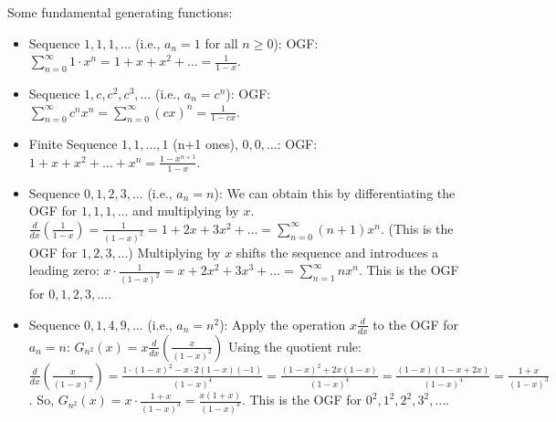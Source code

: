 \documentclass{report}
\begin{document}
Some fundamental generating functions:
\begin{itemize}
	\item Sequence $1, 1, 1, \dots$ (i.e., $a_n = 1$ for all $n \ge 0$):
	      OGF: $\sum_{n=0}^\infty 1 \cdot x^n = 1 + x + x^2 + \dots = \frac{1}{1-x}$.
	\item Sequence $1, c, c^2, c^3, \dots$ (i.e., $a_n = c^n$):
	      OGF: $\sum_{n=0}^\infty c^n x^n = \sum_{n=0}^\infty (cx)^n = \frac{1}{1-cx}$.
	\item Finite Sequence $1, 1, \dots, 1$ (n+1 ones), $0, 0, \dots$:
	      OGF: $1 + x + x^2 + \dots + x^n = \frac{1-x^{n+1}}{1-x}$.
	\item Sequence $0, 1, 2, 3, \dots$ (i.e., $a_n = n$):
	      We can obtain this by differentiating the OGF for $1, 1, 1, \dots$ and multiplying by $x$.
	      $\frac{d}{dx} \left( \frac{1}{1-x} \right) = \frac{1}{(1-x)^2} = 1 + 2x + 3x^2 + \dots = \sum_{n=0}^\infty (n+1)x^n$. (This is the OGF for $1, 2, 3, \dots$)
	      Multiplying by $x$ shifts the sequence and introduces a leading zero:
	      $x \cdot \frac{1}{(1-x)^2} = x + 2x^2 + 3x^3 + \dots = \sum_{n=1}^\infty n x^n$. This is the OGF for $0, 1, 2, 3, \dots$.
	\item Sequence $0, 1, 4, 9, \dots$ (i.e., $a_n = n^2$):
	      Apply the operation $x \frac{d}{dx}$ to the OGF for $a_n=n$:
	      $G_{n^2}(x) = x \frac{d}{dx} \left( \frac{x}{(1-x)^2} \right)$
	      Using the quotient rule: $\frac{d}{dx} \left( \frac{x}{(1-x)^2} \right) = \frac{1 \cdot (1-x)^2 - x \cdot 2(1-x)(-1)}{(1-x)^4} = \frac{(1-x)^2 + 2x(1-x)}{(1-x)^4} = \frac{(1-x)(1-x+2x)}{(1-x)^4} = \frac{1+x}{(1-x)^3}$.
	      So, $G_{n^2}(x) = x \cdot \frac{1+x}{(1-x)^3} = \frac{x(1+x)}{(1-x)^3}$.
	      This is the OGF for $0^2, 1^2, 2^2, 3^2, \dots$.
\end{itemize}

\end{document}
